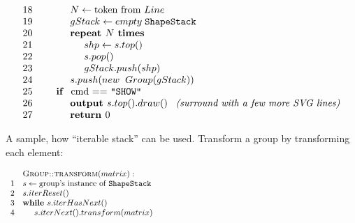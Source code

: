 \documentclass[11pt]{article}
\begin{document}
\[\begin{array}{rl}
18 & \hspace{1.0cm} N \leftarrow \text{token from $Line$}\\
19 & \hspace{1.0cm} gStack \leftarrow empty\;\mathtt{ShapeStack}\\
20 & \hspace{1.0cm} \text{\textbf{repeat $N$ times}}\\
21 & \hspace{1.5cm} shp \leftarrow s.top()\\
22 & \hspace{1.5cm} s.pop()\\
23 & \hspace{1.5cm} gStack.push(shp)\\
24 & \hspace{1.0cm} s.push(new\;\;Group(gStack))\\
25 & \hspace{0.5cm} \text{\textbf{if\ } cmd == {\tt "SHOW"}}\\
26 & \hspace{1.0cm} \text{\textbf{output\ }} s.top().draw()\;\;\;\text{\em (surround with a few more SVG lines)}\\
27 & \hspace{1.0cm} \text{\textbf{return\ }} 0\\
\end{array}
\]



\vspace{10pt}
A sample, how ``iterable stack'' can be used. Transform 
a group by transforming each element:

\[
\begin{array}{rl}
 & \text{\textsc{Group::transform}}(matrix):\\
1 & s \leftarrow \text{group's instance of {\tt ShapeStack}} \hspace{8.7cm} \mbox{}\\
2 & s.iterReset()\\
3 & \text{\textbf{while\ }} s.iterHasNext()\\
4 & \hspace{0.5cm} s.iterNext().transform(matrix)
\end{array}
\]
\end{document}
